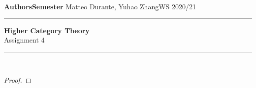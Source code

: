 \documentclass[a4paper,11pt,openany]{scrartcl}
\begin{document}
\noindent\textbf{Authors}\hfill\textbf{Semester} \linebreak
\vspace*{-.1cm} Matteo Durante, Yuhao Zhang\hfill WS 2020/21 \\

\noindent
\rule{\linewidth}{1pt}
\begin{center}
\Large
\textbf{Higher Category Theory} \\
Assignment 4
\end{center}
\rule{\linewidth}{1pt}
\\


\begin{proof}
\end{proof}
\end{document}
